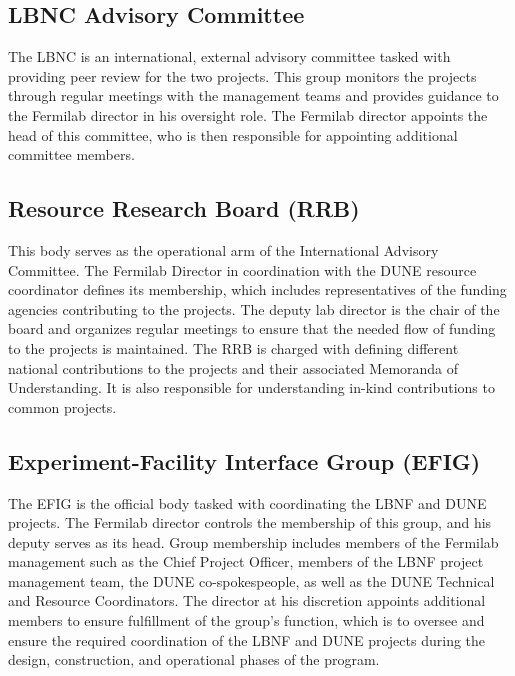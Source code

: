 \subsection{LBNC Advisory Committee}

	The LBNC is an international, external advisory committee tasked with providing peer review for the two projects.  This group monitors the projects through regular meetings with the management teams and provides guidance   to the Fermilab director in his oversight role.  The Fermilab director appoints the head of this committee, who is then responsible for appointing additional committee members. 


\subsection{Resource Research Board (RRB)}

 	This body serves as the operational arm of the International Advisory Committee.  The Fermilab Director in coordination with the DUNE resource coordinator defines its membership, which includes representatives of the funding agencies contributing to the projects.  The deputy lab director is the chair of the board and organizes regular meetings to ensure that the needed  flow of funding to the projects is maintained.  The RRB is charged with defining different national contributions to the projects and their associated Memoranda of Understanding.   It is also responsible for understanding in-kind contributions to common projects. 

\subsection{Experiment-Facility Interface Group (EFIG)}

	The EFIG is the official body tasked with coordinating the LBNF and DUNE projects.  The Fermilab director controls the membership of this group, and his deputy serves as its head.  Group membership includes members of the Fermilab management such as the Chief Project Officer, members of the LBNF project management team, the DUNE co-spokespeople, as well as the DUNE Technical and Resource Coordinators.  The director at his discretion appoints additional members to ensure fulfillment of the group’s function, which is to oversee and ensure the required coordination of the LBNF and DUNE projects during the design, construction, and operational phases of the program.    
	
